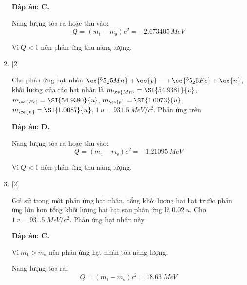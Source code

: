 \begin{enumerate}[label=\bfseries Câu \arabic*:]
	\loigiai
	{		\textbf{Đáp án: C.}
		
		Năng lượng tỏa ra hoặc thu vào:
		$$Q=(m_{\text{t}} - m_\text{s}) c^2 = \SI{-2.673405}{MeV}$$
		
		Vì $Q<0$ nên phản ứng thu năng lượng.
		
	}
	
	\item {} [2]
	\cauhoi
	{Cho phản ứng hạt nhân $\ce{^55_25 Mn} + \ce{p} \longrightarrow \ce{^55_26 Fe} + \ce{n}$, khối lượng của các hạt nhân là $m_{\ce{Mn}} = \SI{54.9381}{u}$, $m_{\ce{Fe}} = \SI{54.9380}{u}$, $m_{\ce{p}} = \SI{1.0073}{u}$, $m_{\ce{n}} = \SI{1.0087}{u}$, $\SI{1}{u} = \SI{931.5}{MeV/c^2}$. Phản ứng trên
	}
	
	\loigiai
	{		\textbf{Đáp án: D.}
		
		Năng lượng tỏa ra hoặc thu vào:
		$$Q=(m_{\text{t}} - m_\text{s}) c^2 = \SI{-1.21095}{MeV}$$
		
		Vì $Q<0$ nên phản ứng thu năng lượng.
		
	}
	\item {} [2]
	\cauhoi
	{Giả sử trong một phản ứng hạt nhân, tổng khối lương hai hạt trước phản ứng lớn hơn tổng khối lượng hai hạt sau phản ứng là $\SI{0.02}{u}$. Cho $\SI{1}{u} = \SI{931.5}{MeV/c^2}$. Phản ứng hạt nhân này
	}
	
	\loigiai
	{		\textbf{Đáp án: C.}
		
		Vì $m_{\text{t}}>m_{\text{s}}$ nên phản ứng hạt nhân tỏa năng lượng:
		
		Năng lượng tỏa ra:
		$$Q=(m_{\text{t}} - m_\text{s}) c^2 = \SI{18.63}{MeV}$$
		
	}
	

\end{enumerate}
